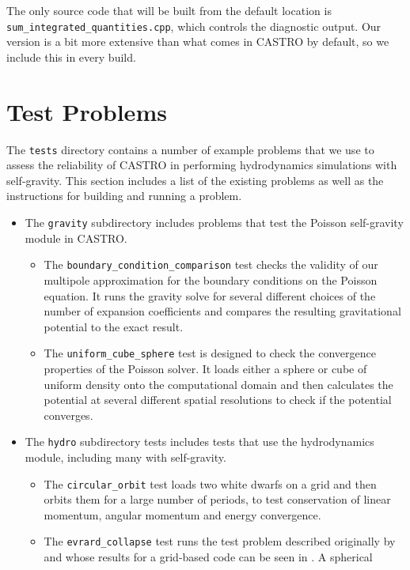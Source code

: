 \documentclass[12pt]{book}
\begin{document}
The only source code that will be built from the default location is \texttt{sum\_integrated\_quantities.cpp},
which controls the diagnostic output. Our version is a bit more extensive than what comes in CASTRO
by default, so we include this in every build.

\chapter{Test Problems}

The \texttt{tests} directory contains a number of example problems that we use
to assess the reliability of CASTRO in performing hydrodynamics simulations 
with self-gravity. This section includes a list of the existing problems 
as well as the instructions for building and running a problem.

\begin{itemize}
  \item The \texttt{gravity} subdirectory includes problems that test the Poisson 
self-gravity module in CASTRO.
  \begin{itemize}
    \item The \texttt{boundary\_condition\_comparison} test checks the validity of our 
multipole approximation for the boundary conditions on the Poisson equation. It runs
the gravity solve for several different choices of the number of expansion coefficients
and compares the resulting gravitational potential to the exact result.
    \item The \texttt{uniform\_cube\_sphere} test is designed to check the convergence
properties of the Poisson solver. It loads either a sphere or cube of uniform density
onto the computational domain and then calculates the potential at several different
spatial resolutions to check if the potential converges.
  \end{itemize}
  \item The \texttt{hydro} subdirectory tests includes tests that use the hydrodynamics 
module, including many with self-gravity.
  \begin{itemize}
    \item The \texttt{circular\_orbit} test loads two white dwarfs on a grid and then orbits
them for a large number of periods, to test conservation of linear momentum,
angular momentum and energy convergence.
    \item The \texttt{evrard\_collapse} test runs the test problem described originally by 
\cite{evrard:1988} and whose results for a grid-based code can be seen in \cite{arepo}. A spherical

\end{itemize}
\end{itemize}
\end{document}
